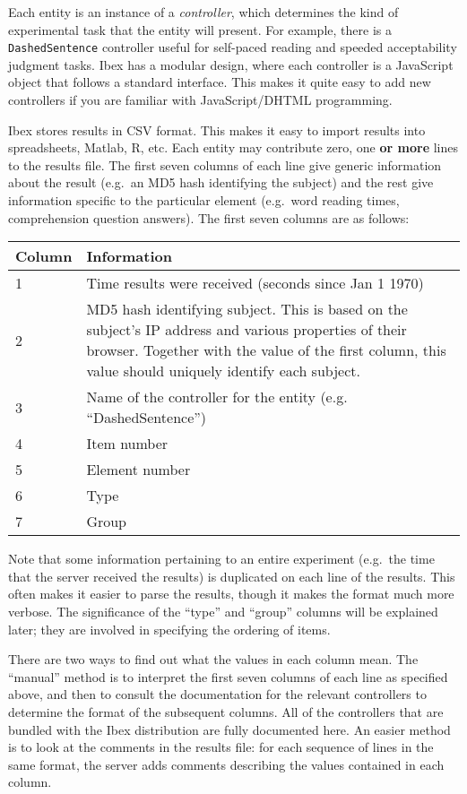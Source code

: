 \documentclass[]{article}
\begin{document}
Each entity is an instance of a \emph{controller}, which determines the
kind of experimental task that the entity will present. For example,
there is a \texttt{DashedSentence} controller useful for self-paced
reading and speeded acceptability judgment tasks. Ibex has a modular
design, where each controller is a JavaScript object that follows a
standard interface. This makes it quite easy to add new controllers if
you are familiar with JavaScript/DHTML programming.

Ibex stores results in CSV format. This makes it easy to import results
into spreadsheets, Matlab, R, etc. Each entity may contribute zero, one
\textbf{or more} lines to the results file. The first seven columns of
each line give generic information about the result (e.g.~an MD5 hash
identifying the subject) and the rest give information specific to the
particular element (e.g.~word reading times, comprehension question
answers). The first seven columns are as follows:

\begin{longtable}[c]{p{1in}p{5in}}
\toprule
\textbf{Column} & \textbf{Information}\tabularnewline
\midrule
\endhead
1 & Time results were received (seconds since Jan 1 1970)\tabularnewline
2 & MD5 hash identifying subject. This is based on the subject's IP
address and various properties of their browser. Together with the value
of the first column, this value should uniquely identify each
subject.\tabularnewline
3 & Name of the controller for the entity (e.g.
``DashedSentence'')\tabularnewline
4 & Item number\tabularnewline
5 & Element number\tabularnewline
6 & Type\tabularnewline
7 & Group\tabularnewline
\bottomrule
\end{longtable}

Note that some information pertaining to an entire experiment (e.g.~the
time that the server received the results) is duplicated on each line of
the results. This often makes it easier to parse the results, though it
makes the format much more verbose. The significance of the ``type'' and
``group'' columns will be explained later; they are involved in
specifying the ordering of items.

There are two ways to find out what the values in each column mean. The
``manual'' method is to interpret the first seven columns of each line
as specified above, and then to consult the documentation for the
relevant controllers to determine the format of the subsequent columns.
All of the controllers that are bundled with the Ibex distribution are
fully documented here. An easier method is to look at the comments in
the results file: for each sequence of lines in the same format, the
server adds comments describing the values contained in each column.
\end{document}
